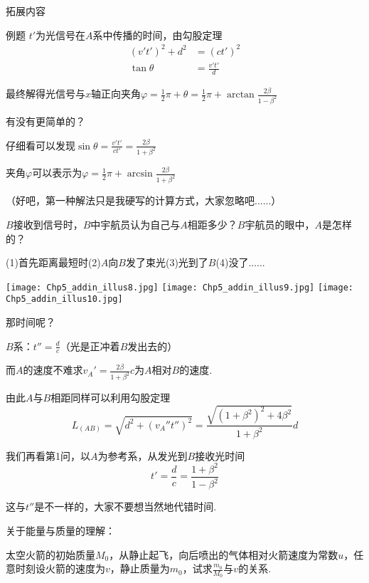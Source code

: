 \documentclass[a4paper, opensource]{./template/qyxf-book}
\begin{document}
\begin{section}{拓展内容}
\begin{subsection}{例题}
$t'$为光信号在$A$系中传播的时间，由勾股定理
\begin{align*}
(v't')^2+d^2&=(ct')^2\\\tan{\theta}&=\frac{v't'}{d}
\end{align*}

最终解得光信号与$x$轴正向夹角$\varphi=\frac{1}{2}\pi+\theta=\frac{1}{2}\pi+\arctan{\frac{2\beta}{1-\beta^2}}$

有没有更简单的？

仔细看可以发现$\sin{\theta}=\frac{v't'}{ct'}=\frac{2\beta}{1+\beta^2}$

夹角$\varphi$可以表示为$\varphi=\frac{1}{2}\pi+\arcsin{\frac{2\beta}{1+\beta^2}}$

（好吧，第一种解法只是我硬写的计算方式，大家忽略吧......）

$B$接收到信号时，$B$中宇航员认为自己与$A$相距多少？$B$宇航员的眼中，$A$是怎样的？

(1)首先距离最短时\hspace{2em}(2)$A$向$B$发了束光\hspace{2em}(3)光到了$B$\hspace{2em}(4)没了......

\hspace{3em}\texttt{[image: Chp5\_addin\_illus8.jpg]}
\hspace{7em}\texttt{[image: Chp5\_addin\_illus9.jpg]}
\hspace{5em}\texttt{[image: Chp5\_addin\_illus10.jpg]}

那时间呢？

\solve
$B$系：$t''=\frac{d}{c}$（光是正冲着$B$发出去的）

而$A$的速度不难求\hspace{2em}$v_A'=\frac{2\beta}{1+\beta^2}c$为$A$相对$B$的速度.

由此$A$与$B$相距同样可以利用勾股定理
\begin{equation*}
L_(AB)=\sqrt{d^2+(v_A''t'')^2}=\frac{\sqrt{(1+\beta^2)^2+4\beta^2}}{1+\beta^2}d
\end{equation*}

我们再看第1问，以$A$为参考系，从发光到$B$接收光时间
\begin{equation*}
t'=\frac{d}{c}=\frac{1+\beta^2}{1-\beta^2}
\end{equation*}

这与$t''$是不一样的，大家不要想当然地代错时间.

关于能量与质量的理解：

太空火箭的初始质量$M_0$，从静止起飞，向后喷出的气体相对火箭速度为常数$u$，任意时刻设火箭的速度为$v$，静止质量为$m_0$，试求$\frac{m_0}{M_0}$与$v$的关系.


\end{subsection}
\end{section}
\end{document}
